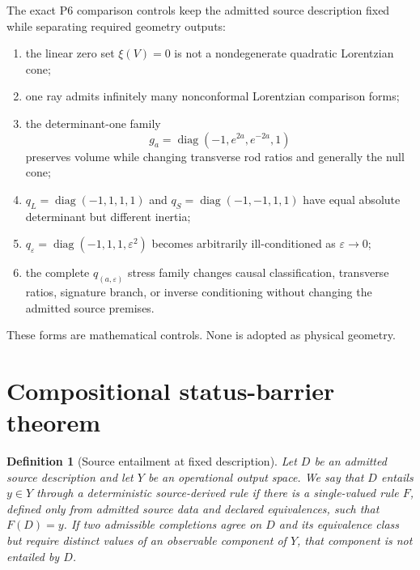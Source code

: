 \documentclass[11pt]{article}
\newtheorem{definition}{Definition}
\begin{document}
The exact P6 comparison controls keep the admitted source description fixed
while separating required geometry outputs:
\begin{enumerate}
  \item the linear zero set \(\xi(V)=0\) is not a nondegenerate quadratic
  Lorentzian cone;
  \item one ray admits infinitely many nonconformal Lorentzian comparison
  forms;
  \item the determinant-one family
  \[
    g_a=\operatorname{diag}(-1,e^{2a},e^{-2a},1)
  \]
  preserves volume while changing transverse rod ratios and generally the
  null cone;
  \item \(q_L=\operatorname{diag}(-1,1,1,1)\) and
  \(q_S=\operatorname{diag}(-1,-1,1,1)\) have equal absolute determinant but
  different inertia;
  \item \(q_\varepsilon=\operatorname{diag}(-1,1,1,\varepsilon^2)\) becomes
  arbitrarily ill-conditioned as \(\varepsilon\to0\);
  \item the complete \(q_{(a,\varepsilon)}\) stress family changes causal
  classification, transverse ratios, signature branch, or inverse
  conditioning without changing the admitted source premises.
\end{enumerate}
These forms are mathematical controls.  None is adopted as physical geometry.

\section{Compositional status-barrier theorem}

\begin{definition}[Source entailment at fixed description]
\label{def:entailment}
Let \(D\) be an admitted source description and let \(Y\) be an operational
output space.  We say that \(D\) entails \(y\in Y\) through a deterministic
source-derived rule if there is a single-valued rule \(F\), defined only from
admitted source data and declared equivalences, such that \(F(D)=y\).
If two admissible completions agree on \(D\) and its equivalence class but
require distinct values of an observable component of \(Y\), that component
is not entailed by \(D\).
\end{definition}
\end{document}
